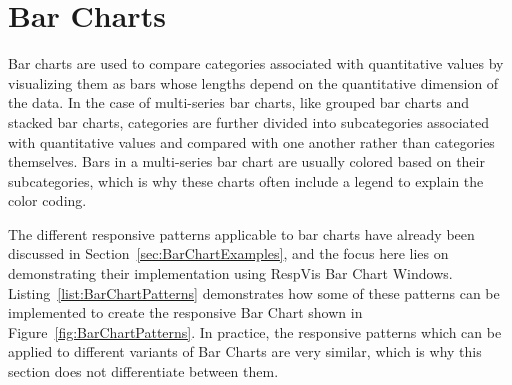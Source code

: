 \section{Bar Charts}
\label{sec:BarChartsUsage}

Bar charts are used to compare categories associated with quantitative
values by visualizing them as bars whose lengths depend on the
quantitative dimension of the data. In the case of multi-series bar
charts, like grouped bar charts and stacked bar charts, categories are
further divided into subcategories associated with quantitative values
and compared with one another rather than categories themselves. Bars
in a multi-series bar chart are usually colored based on their
subcategories, which is why these charts often include a legend to
explain the color coding.



The different responsive patterns applicable to bar charts have
already been discussed in Section~\ref{sec:BarChartExamples}, and the
focus here lies on demonstrating their implementation using RespVis
Bar Chart Windows. Listing~\ref{list:BarChartPatterns} demonstrates
how some of these patterns can be implemented to create the responsive
Bar Chart shown in Figure~\ref{fig:BarChartPatterns}. In practice, the
responsive patterns which can be applied to different variants of Bar
Charts are very similar, which is why this section does not
differentiate between them.



